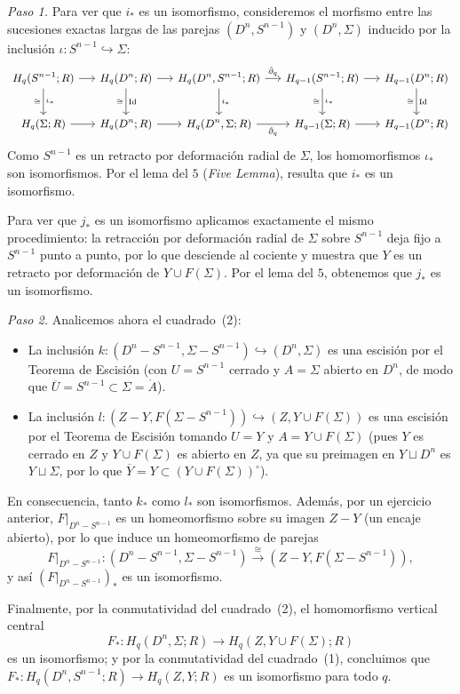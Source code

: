 \begin{dem}
\smallskip
\noindent\textit{Paso 1.} Para ver que $i_*$ es un isomorfismo, consideremos el morfismo entre las sucesiones exactas largas de las parejas $(D^n, S^{n-1})$ y $(D^n, \Sigma)$ inducido por la inclusión $\iota \colon S^{n-1} \hookrightarrow \Sigma$:
\[
{\small
\begin{tikzcd}[column sep=1.45em, row sep=2.4em]
H_q(S^{n-1}; R)
    \arrow[r]
    \arrow[d, "\iota_*", "\cong"']
& H_q(D^n; R)
    \arrow[r]
    \arrow[d, "\operatorname{Id}", "\cong"']
& H_q(D^n, S^{n-1}; R)
    \arrow[r, "\hat{\partial}_q"]
    \arrow[d, "i_*"]
& H_{q-1}(S^{n-1}; R)
    \arrow[r]
    \arrow[d, "\iota_*", "\cong"']
& H_{q-1}(D^n; R)
    \arrow[d, "\operatorname{Id}", "\cong"'] \\
H_q(\Sigma; R)
    \arrow[r]
& H_q(D^n; R)
    \arrow[r]
& H_q(D^n, \Sigma; R)
    \arrow[r, "\hat{\partial}_q"']
& H_{q-1}(\Sigma; R)
    \arrow[r]
& H_{q-1}(D^n; R)
\end{tikzcd}}
\]
Como $S^{n-1}$ es un retracto por deformación radial de $\Sigma$, los homomorfismos $\iota_*$ son isomorfismos. Por el lema del $5$ (\textit{Five Lemma}), resulta que $i_*$ es un isomorfismo.

Para ver que $j_*$ es un isomorfismo aplicamos exactamente el mismo procedimiento: la retracción por deformación radial de $\Sigma$ sobre $S^{n-1}$ deja fijo a $S^{n-1}$ punto a punto, por lo que desciende al cociente y muestra que $Y$ es un retracto por deformación de $Y \cup F(\Sigma)$. Por el lema del $5$, obtenemos que $j_*$ es un isomorfismo.

\smallskip
\noindent\textit{Paso 2.} Analicemos ahora el cuadrado~(2):
\begin{itemize}
    \item La inclusión $k \colon (D^n - S^{n-1}, \Sigma - S^{n-1}) \hookrightarrow (D^n, \Sigma)$ es una escisión por el Teorema de Escisión (con $U = S^{n-1}$ cerrado y $A = \Sigma$ abierto en $D^n$, de modo que $\overline{U} = S^{n-1} \subset \Sigma = \mathring{A}$).
    \item La inclusión $l \colon (Z - Y, F(\Sigma - S^{n-1})) \hookrightarrow (Z, Y \cup F(\Sigma))$ es una escisión por el Teorema de Escisión tomando $U = Y$ y $A = Y \cup F(\Sigma)$ (pues $Y$ es cerrado en $Z$ y $Y \cup F(\Sigma)$ es abierto en $Z$, ya que su preimagen en $Y \sqcup D^n$ es $Y \sqcup \Sigma$, por lo que $\overline{Y} = Y \subset (Y \cup F(\Sigma))^\circ$).
\end{itemize}
En consecuencia, tanto $k_*$ como $l_*$ son isomorfismos. Además, por un ejercicio anterior, $F|_{D^n - S^{n-1}}$ es un homeomorfismo sobre su imagen $Z - Y$ (un encaje abierto), por lo que induce un homeomorfismo de parejas
\[
F|_{D^n - S^{n-1}} \colon (D^n - S^{n-1}, \Sigma - S^{n-1}) \xrightarrow{\;\cong\;} (Z - Y, F(\Sigma - S^{n-1})),
\]
y así $(F|_{D^n - S^{n-1}})_*$ es un isomorfismo.

Finalmente, por la conmutatividad del cuadrado~(2), el homomorfismo vertical central 
$$F_* \colon H_q(D^n, \Sigma; R) \to H_q(Z, Y \cup F(\Sigma); R)$$ es un isomorfismo; y por la conmutatividad del cuadrado~(1), concluimos que $F_* \colon H_q(D^n, S^{n-1}; R) \to H_q(Z, Y; R)$ es un isomorfismo para todo $q$.
\end{dem}
